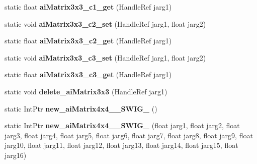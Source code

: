 \begin{DoxyCompactItemize}
\item 
\hypertarget{class_assimp_p_i_n_v_o_k_e_a190fd0b2ca08e5d7304d1f440570284d}{static float {\bfseries ai\+Matrix3x3\+\_\+c1\+\_\+get} (Handle\+Ref jarg1)}\label{class_assimp_p_i_n_v_o_k_e_a190fd0b2ca08e5d7304d1f440570284d}

\item 
\hypertarget{class_assimp_p_i_n_v_o_k_e_a2688cb1d3887bc6257d6f2765e394fa3}{static void {\bfseries ai\+Matrix3x3\+\_\+c2\+\_\+set} (Handle\+Ref jarg1, float jarg2)}\label{class_assimp_p_i_n_v_o_k_e_a2688cb1d3887bc6257d6f2765e394fa3}

\item 
\hypertarget{class_assimp_p_i_n_v_o_k_e_a6b5a9417afe2da8839a30c600673bfd5}{static float {\bfseries ai\+Matrix3x3\+\_\+c2\+\_\+get} (Handle\+Ref jarg1)}\label{class_assimp_p_i_n_v_o_k_e_a6b5a9417afe2da8839a30c600673bfd5}

\item 
\hypertarget{class_assimp_p_i_n_v_o_k_e_a59c779e81e473b879f41071e5df25607}{static void {\bfseries ai\+Matrix3x3\+\_\+c3\+\_\+set} (Handle\+Ref jarg1, float jarg2)}\label{class_assimp_p_i_n_v_o_k_e_a59c779e81e473b879f41071e5df25607}

\item 
\hypertarget{class_assimp_p_i_n_v_o_k_e_a635f3d95d97043a9fd5c4597f422d1d3}{static float {\bfseries ai\+Matrix3x3\+\_\+c3\+\_\+get} (Handle\+Ref jarg1)}\label{class_assimp_p_i_n_v_o_k_e_a635f3d95d97043a9fd5c4597f422d1d3}

\item 
\hypertarget{class_assimp_p_i_n_v_o_k_e_a82fb470f72cd2ade8304663036bb0a5e}{static void {\bfseries delete\+\_\+ai\+Matrix3x3} (Handle\+Ref jarg1)}\label{class_assimp_p_i_n_v_o_k_e_a82fb470f72cd2ade8304663036bb0a5e}

\item 
\hypertarget{class_assimp_p_i_n_v_o_k_e_a188aec14476a3a9d1238bd18096ad98b}{static Int\+Ptr {\bfseries new\+\_\+ai\+Matrix4x4\+\_\+\+\_\+\+S\+W\+I\+G\+\_} ()}\label{class_assimp_p_i_n_v_o_k_e_a188aec14476a3a9d1238bd18096ad98b}

\item 
\hypertarget{class_assimp_p_i_n_v_o_k_e_a49660442bee2d60eaa87947e4b417751}{static Int\+Ptr {\bfseries new\+\_\+ai\+Matrix4x4\+\_\+\+\_\+\+S\+W\+I\+G\+\_} (float jarg1, float jarg2, float jarg3, float jarg4, float jarg5, float jarg6, float jarg7, float jarg8, float jarg9, float jarg10, float jarg11, float jarg12, float jarg13, float jarg14, float jarg15, float jarg16)}\label{class_assimp_p_i_n_v_o_k_e_a49660442bee2d60eaa87947e4b417751}


\end{DoxyCompactItemize}
